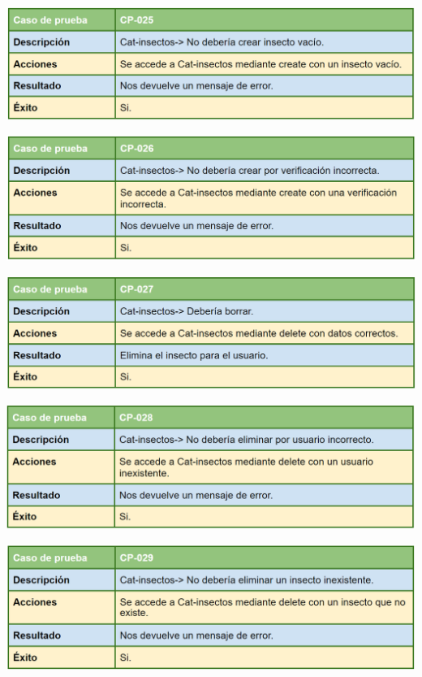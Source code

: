 \bigskip

\includegraphics[width=\textwidth]{img/cap7/cp-025.png}

\bigskip

\includegraphics[width=\textwidth]{img/cap7/cp-026.png}

\bigskip

\includegraphics[width=\textwidth]{img/cap7/cp-027.png}

\bigskip

\includegraphics[width=\textwidth]{img/cap7/cp-028.png}

\bigskip

\includegraphics[width=\textwidth]{img/cap7/cp-029.png}

